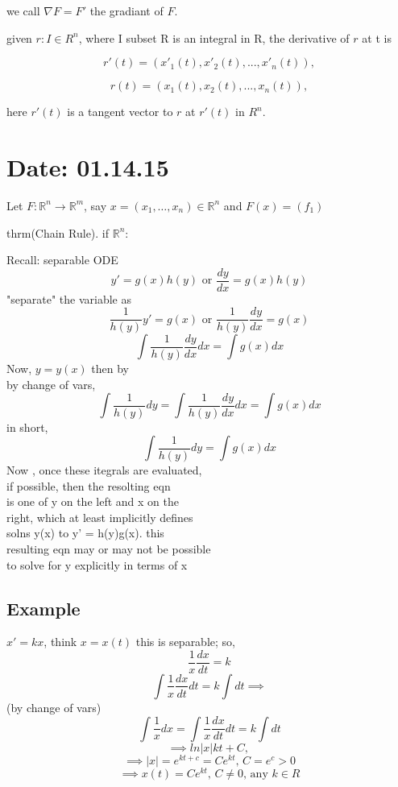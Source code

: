 \documentclass[10pt,a4paper]{article}
\begin{document}
  we call $\nabla F = F'$ 
  the gradiant of $F$.

  given $r : I \in R^n$, where I subset R is an integral 
  in R, the derivative of $r$ at t is 

  $$ r'(t) = (x'_1(t), x'_2(t), ... , x'_n(t)),$$ 
  
  $$ r(t) = (x_1(t), x_2(t), ... , x_n(t)),$$

  here $r'(t)$ is a tangent vector to $r$ at 
  $r'(t)$ in $R^n$.

\section{Date: 01.14.15}

  Let \( F: \mathbb{R}^n \to \mathbb{R}^m \), say \( x = (x_1, \dots ,
  x_n) \in \mathbb{R}^n  \) and \( F(x) = (f_1) \)

  thrm(Chain Rule). if \( \mathbb{R}^n \): 

\newpage
Recall: separable ODE
$$y' = g(x)h(y) \text{ or } \frac{dy}{dx} = g(x)h(y)$$
"separate" the variable as \\
$$\frac{1}{h(y)} y' = g(x) \text{ or }  \frac{1}{h(y)}\frac{dy}{dx} =g(x)$$
$$\int\frac{1}{h(y)} \frac{dy}{dx} dx = \int g(x)dx$$
Now, $y = y(x)$ then by  \\
by change of vars,  \\
$$\int \frac{1}{h(y)} dy = \int \frac{1}{h(y)} \frac{dy}{dx} dx = \int g(x)dx $$
in short,  \\
$$\int \frac{1}{h(y)} dy = \int g(x)dx$$
Now , once these itegrals are evaluated, \\
if possible, then the resolting eqn \\
is one of y on the left and x on the \\
right, which at least implicitly defines  \\
solns y(x) to y' = h(y)g(x). this  \\
resulting eqn may or may not be possible  \\
to solve for y explicitly in terms of x \\

\subsection*{Example}
$x'=kx$, think $x=x(t)$
this is separable; so, 
$$\frac{1}{x} \frac{dx}{dt} = k$$
$$\int \frac{1}{x} \frac{dx}{dt} dt = k \int dt \implies $$
(by change of vars)
$$\int \frac{1}{x} dx = \int \frac{1}{x} \frac{dx}{dt} dt = k\int dt$$
$$\implies ln|x| kt + C \text{, }$$ 
$$\implies |x| = e^{kt+c} = Ce^{kt} \text{, } C=e^c >0$$  
$$\implies x(t) = Ce^{kt}\text{, } C  \neq 0\text{, any }k \in R$$ 
\end{document}
